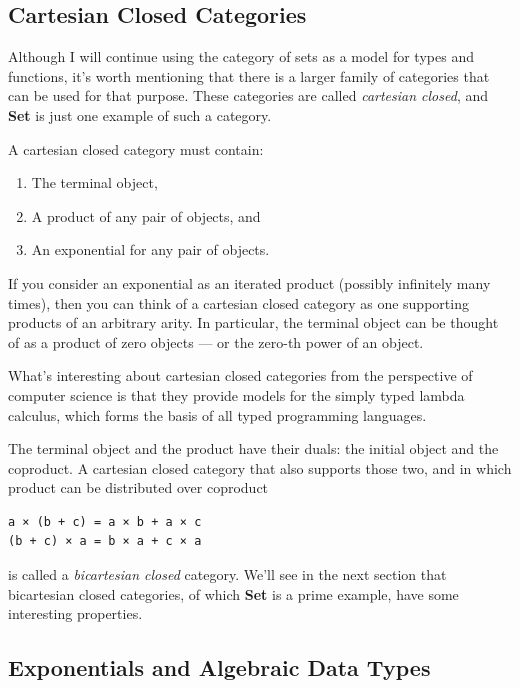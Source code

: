 \subsection{Cartesian Closed
Categories}\label{cartesian-closed-categories}

Although I will continue using the category of sets as a model for types
and functions, it's worth mentioning that there is a larger family of
categories that can be used for that purpose. These categories are
called \emph{cartesian closed}, and \textbf{Set} is just one example of
such a category.

A cartesian closed category must contain:

\begin{enumerate}
\tightlist
\item
  The terminal object,
\item
  A product of any pair of objects, and
\item
  An exponential for any pair of objects.
\end{enumerate}

If you consider an exponential as an iterated product (possibly
infinitely many times), then you can think of a cartesian closed
category as one supporting products of an arbitrary arity. In
particular, the terminal object can be thought of as a product of zero
objects --- or the zero-th power of an object.

What's interesting about cartesian closed categories from the
perspective of computer science is that they provide models for the
simply typed lambda calculus, which forms the basis of all typed
programming languages.

The terminal object and the product have their duals: the initial object
and the coproduct. A cartesian closed category that also supports those
two, and in which product can be distributed over coproduct

\begin{verbatim}
a × (b + c) = a × b + a × c
(b + c) × a = b × a + c × a
\end{verbatim}

is called a \emph{bicartesian closed} category. We'll see in the next
section that bicartesian closed categories, of which \textbf{Set} is a
prime example, have some interesting properties.

\subsection{Exponentials and Algebraic Data
Types}\label{exponentials-and-algebraic-data-types}

